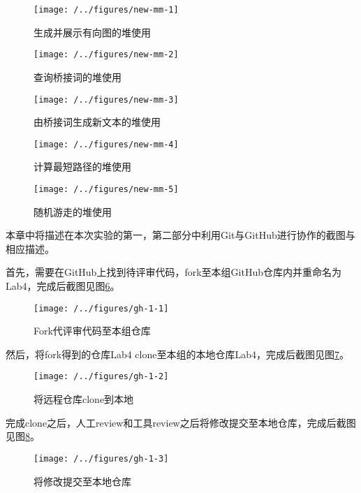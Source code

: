 \begin{figure}
\centering
\texttt{[image: /../figures/new-mm-1]}
\caption{生成并展示有向图的堆使用}
\label{fig:new-mm-1}
\end{figure}

\begin{figure}
\centering
\texttt{[image: /../figures/new-mm-2]}
\caption{查询桥接词的堆使用}
\label{fig:new-mm-2}
\end{figure}

\begin{figure}
\centering
\texttt{[image: /../figures/new-mm-3]}
\caption{由桥接词生成新文本的堆使用}
\label{fig:new-mm-3}
\end{figure}

\begin{figure}
\centering
\texttt{[image: /../figures/new-mm-4]}
\caption{计算最短路径的堆使用}
\label{fig:new-mm-4}
\end{figure}

\begin{figure}
\centering
\texttt{[image: /../figures/new-mm-5]}
\caption{随机游走的堆使用}
\label{fig:new-mm-5}
\end{figure}

本章中将描述在本次实验的第一，第二部分中利用Git与GitHub进行协作的截图与相应描述。

首先，需要在GitHub上找到待评审代码，fork至本组GitHub仓库内并重命名为Lab4，完成后截图见图\ref{fig:gh-1-1}。

\begin{figure}
\centering
\texttt{[image: /../figures/gh-1-1]}
\caption{Fork代评审代码至本组仓库}
\label{fig:gh-1-1}
\end{figure}

然后，将fork得到的仓库Lab4 clone至本组的本地仓库Lab4，完成后截图见图\ref{fig:gh-1-2}。

\begin{figure}
\centering
\texttt{[image: /../figures/gh-1-2]}
\caption{将远程仓库clone到本地}
\label{fig:gh-1-2}
\end{figure}

完成clone之后，人工review和工具review之后将修改提交至本地仓库，完成后截图见图\ref{fig:gh-1-3}。

\begin{figure}
\centering
\texttt{[image: /../figures/gh-1-3]}
\caption{将修改提交至本地仓库}
\label{fig:gh-1-3}
\end{figure}

